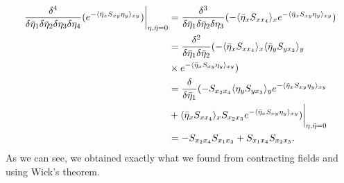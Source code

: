 \begin{ex}
    \begin{equation}
        \begin{split}
            \frac{\delta^4}{\delta\bar{\eta}_1\delta\bar{\eta}_2\delta\eta_3\delta\eta_4}(e^{-\langle \bar{\eta}_xS_{xy}\eta_y \rangle_{xy}})\bigg|_{\eta,\bar{\eta}=0} &= \frac{\delta^3}{\delta\bar{\eta}_1\delta\bar{\eta}_2\delta\eta_3}(-\langle \bar{\eta}_xS_{xx_4} \rangle_xe^{-\langle \bar{\eta}_xS_{xy}\eta_y \rangle_{xy}}) \\
            &= \frac{\delta^2}{\delta\bar{\eta}_1\delta\bar{\eta}_2}(-\langle \bar{\eta}_xS_{xx_4} \rangle_x\langle \bar{\eta}_yS_{yx_3} \rangle_y \\
            &\times e^{-\langle \bar{\eta}_xS_{xy}\eta_y \rangle_{xy}}) \\
            &= \frac{\delta}{\delta\bar{\eta}_1}(-S_{x_2x_4}\langle \eta_yS_{yx_3} \rangle_ye^{-\langle \bar{\eta}_xS_{xy}\eta_y \rangle_{xy}} \\
            &+ \langle \bar{\eta}_xS_{xx_4} \rangle_xS_{x_2x_3}e^{-\langle \bar{\eta}_xS_{xy}\eta_y \rangle_{xy}})\bigg|_{\eta,\bar{\eta}=0} \\
            &= -S_{x_2x_4}S_{x_1x_3} + S_{x_1x_4}S_{x_2x_3}.
        \end{split}
    \end{equation}
    As we can see, we obtained exactly what we found from contracting fields and using Wick's theorem.
\end{ex}